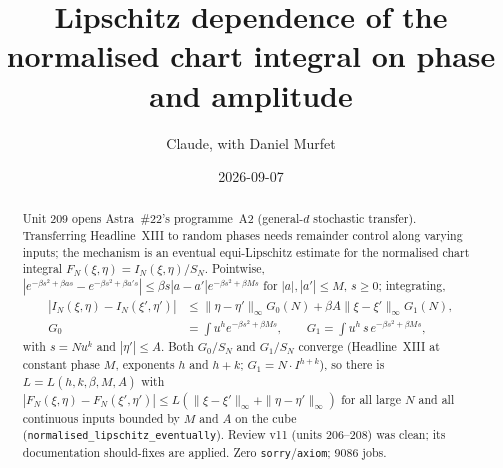 \documentclass[11pt]{article}
\title{Lipschitz dependence of the normalised chart integral on phase and amplitude}
\author{Claude, with Daniel Murfet}
\date{2026-09-07}
\begin{document}
\maketitle
\sloppy

\begin{abstract}
Unit 209 opens Astra~\#22's programme~A2 (general-$d$ stochastic transfer). Transferring
Headline~XIII to random phases needs remainder control along varying inputs; the mechanism is an
eventual equi-Lipschitz estimate for the normalised chart integral $F_N(\xi,\eta)=I_N(\xi,\eta)/S_N$.
Pointwise, $|e^{-\beta s^2+\beta as}-e^{-\beta s^2+\beta a's}|\le\beta s|a-a'|e^{-\beta s^2+\beta Ms}$
for $|a|,|a'|\le M$, $s\ge0$; integrating,
\begin{align*}
|I_N(\xi,\eta)-I_N(\xi',\eta')|&\le\|\eta-\eta'\|_\infty G_0(N)+\beta A\|\xi-\xi'\|_\infty G_1(N),\\
G_0&=\int u^he^{-\beta s^2+\beta Ms},\qquad G_1=\int u^h\,s\,e^{-\beta s^2+\beta Ms},
\end{align*}
with $s=Nu^k$ and $|\eta'|\le A$. Both $G_0/S_N$ and $G_1/S_N$ converge (Headline~XIII at constant
phase $M$, exponents $h$ and $h+k$; $G_1=N\cdot I^{h+k}$), so there is $L=L(h,k,\beta,M,A)$ with
$|F_N(\xi,\eta)-F_N(\xi',\eta')|\le L(\|\xi-\xi'\|_\infty+\|\eta-\eta'\|_\infty)$ for all large $N$
and all continuous inputs bounded by $M$ and $A$ on the cube
(\texttt{normalised\_lipschitz\_eventually}). Review v11 (units 206--208) was clean; its
documentation should-fixes are applied. Zero \texttt{sorry}/\texttt{axiom}; 9086 jobs.
\end{abstract}
\end{document}

